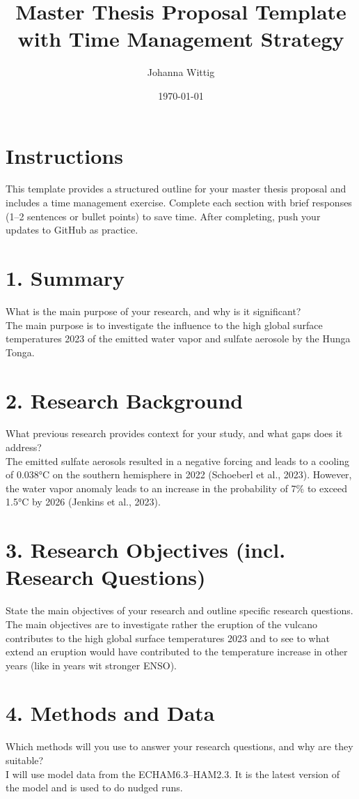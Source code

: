 \documentclass[a4paper,12pt]{article}
\title{Master Thesis Proposal Template with Time Management Strategy}
\author{Johanna Wittig}
\date{\today}
\begin{document}
\maketitle

\section*{Instructions}
This template provides a structured outline for your master thesis proposal and includes a time management exercise. Complete each section with brief responses (1–2 sentences or bullet points) to save time. After completing, push your updates to GitHub as practice.

\section{1. Summary}
What is the main purpose of your research, and why is it significant?\\
The main purpose is to investigate the influence to the high global surface temperatures 2023 of the emitted water vapor and sulfate aerosole by the Hunga Tonga.

\section{2. Research Background}
What previous research provides context for your study, and what gaps does it address?\\ The emitted sulfate aerosols resulted in a negative forcing and leads to a cooling of 0.038°C on the southern hemisphere in 2022 (Schoeberl et al., 2023). However, the water vapor anomaly leads to an increase in the probability of 7\% to exceed 1.5°C by 2026 (Jenkins et al., 2023). 

\section{3. Research Objectives (incl. Research Questions)}
State the main objectives of your research and outline specific research questions.\\
The main objectives are to investigate rather the eruption of the vulcano contributes to the high global surface temperatures 2023 and to see to what extend an eruption would have contributed to the temperature increase in other years (like in years wit stronger ENSO).

\section{4. Methods and Data}
Which methods will you use to answer your research questions, and why are they suitable?\\ I will use model data from the ECHAM6.3–HAM2.3. It is the latest version of the model and is used to do nudged runs.
\end{document}
